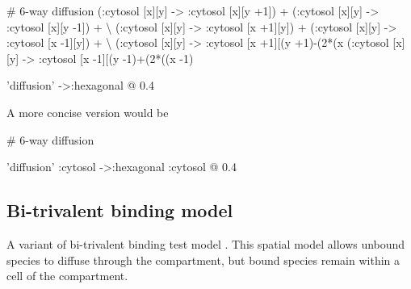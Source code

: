 \begin{kappasource}


# 6-way diffusion
    (:cytosol [x][y] -> :cytosol [x][y +1]) + (:cytosol [x][y] -> :cytosol [x][y -1]) + {\textbackslash}
    (:cytosol [x][y] -> :cytosol [x +1][y]) + (:cytosol [x][y] -> :cytosol [x -1][y]) + {\textbackslash}
    (:cytosol [x][y] -> :cytosol [x +1][(y +1)-(2*(x%
    (:cytosol [x][y] -> :cytosol [x -1][(y -1)+(2*((x -1)%

'diffusion' ->:hexagonal @ 0.4


\end{kappasource}

A more concise version would be

\begin{kappasource}


# 6-way diffusion

'diffusion' :cytosol ->:hexagonal :cytosol @ 0.4


\end{kappasource}


\subsection{Bi-trivalent binding model}
\label{sec:bitrivalent}


A variant of bi-trivalent binding test model \citep{yang2008kinetic}. This spatial model allows unbound species to diffuse through the compartment, but bound species remain within a cell of the compartment.


